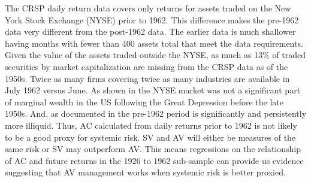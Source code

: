 
The CRSP daily return data covers only returns for assets traded on the New York Stock Exchange (NYSE) prior to 1962. This difference makes the pre-1962 data very different from the post-1962 data. The earlier data is much shallower having months with fewer than 400 assets total that meet the data requirements. Given the value of the assets traded outside the NYSE, as much as 13\% of traded securities by market capitalization are missing from the CRSP data as of the 1950s. \citep{nyse_history,staff_american_2003} Twice as many firms covering twice as many industries are available in July 1962 versus June. As shown in \citet{taylor_2014} the NYSE market was not a significant part of marginal wealth in the US following the Great Depression before the late 1950s. And, as documented in \citet{jones_century_2002} the pre-1962 period is significantly and persistently more illiquid. Thus, AC calculated from daily returns prior to 1962 is not likely to be a good proxy for systemic risk. SV and AV will either be measures of the same risk or SV may outperform AV. This means regressions on the relationship of AC and future returns in the 1926 to 1962 sub-sample can provide us evidence suggesting that AV management works when systemic risk is better proxied.


